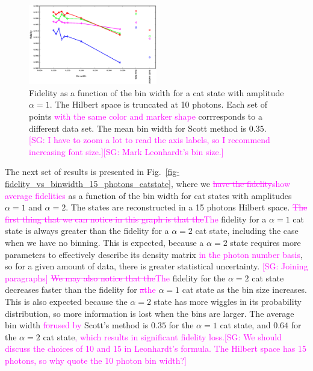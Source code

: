 \documentclass[
reprint,
superscriptaddress,
showpacs,
amsmath,
amssymb,
aps,
pra,
longbibliography
]{revtex4-1}
\providecommand{\aucmnt}[1]{#1}
\providecommand{\editcolor}[2]{\textcolor{#1}{#2}}
\providecommand{\aucmnt}[1]{}
\providecommand{\editcolor}[2]{#2}
\newcommand{\SG}[1]{\editcolor{magenta}{#1}}
\newcommand{\SGs}[1]{\aucmnt{\editcolor{magenta}{\sout{#1}}}}
\newcommand{\SGc}[1]{\aucmnt{\editcolor{magenta}{[SG: #1]}}}
\begin{document}
\begin{figure}
  \includegraphics[width=0.5\textwidth]{methods_fidelity_singledata.eps}
  \caption{Fidelity as a function of the bin width for a cat state
    with amplitude $\alpha=1$. The Hilbert space is truncated at 10
    photons. Each set of points \SG{with the same color and marker
      shape} corrresponds to a different data set. The mean bin width
    for Scott method is $0.35$. \SGc{I have to zoom a lot to read the
      axis labels, so I recommend increasing font size.}\SGc{Mark
      Leonhardt's bin size.}}
  \label{fig-methods_fidelity_singledata}
\end{figure}



The next set of results is presented in
Fig.~\ref{fig-fidelity_vs_binwidth_15_photons_catstate}, where we
\SGs{have the fidelity}\SG{show average fidelities} as a function of
the bin width for cat states with amplitudes $\alpha=1$ and
$\alpha=2$. The states are reconstructed in a 15 photons Hilbert
space. \SGs{The first thing that we can notice in this graph is that
  the}\SG{The} fidelity for a $\alpha=1$ cat state is always greater
than the fidelity for a $\alpha=2$ cat state, including the case when
we have no binning. This is expected, because a $\alpha = 2$ state
requires more parameters to effectively describe its density matrix
\SG{in the photon number basis}, so for a given amount of data, there
is greater statistical uncertainty. \SGc{Joining paragraphs} \SGs{We
  may also notice that the}\SG{The} fidelity for the $\alpha = 2$ cat
state decreases faster than the fidelity for \SGs{a}\SG{the}
$\alpha=1$ cat state as the bin size increases. This is also expected
because the $\alpha = 2$ state has more wiggles in its probability
distribution, so more information is lost when the bins are
larger. The average bin width \SGs{for}\SG{used by} Scott's method is
$0.35$ for the $\alpha=1$ cat state, and $0.64$ for the $\alpha=2$ cat
state\SG{, which results in significant fidelity loss.}\SGc{We should
  discuss the choices of 10 and 15 in Leonhardt's formula.  The
  Hilbert space has 15 photons, so why quote the 10 photon bin width?}
\end{document}
